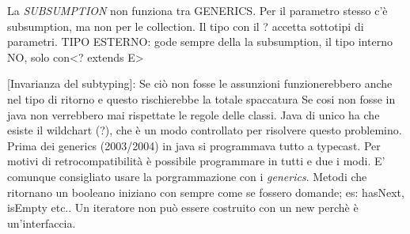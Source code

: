 \noindent La \textit{SUBSUMPTION} non funziona tra GENERICS. Per il parametro stesso c'è subsumption, ma non per le collection. Il tipo con il ? accetta sottotipi di parametri.
\newline
TIPO ESTERNO: gode sempre della la subsumption, il tipo interno NO, solo con<? extends E>  \newline

[Invarianza del subtyping]: Se ciò non fosse le assunzioni funzionerebbero anche nel tipo di ritorno e questo rischierebbe la totale spaccatura \newline
Se cosi non fosse in java non verrebbero mai rispettate le regole delle classi. \newline
Java di unico ha che esiste il wildchart (?), che è un modo controllato per risolvere questo problemino. \newline
Prima dei generics (2003/2004) in java si programmava tutto a typecast. Per motivi di retrocompatibilità è possibile programmare in tutti e due i modi. E' comunque consigliato usare la porgrammazione con i \textit{generics}. \newline
Metodi che ritornano un booleano iniziano con sempre come se fossero domande; es: hasNext, isEmpty etc.. \newline
Un iteratore non può essere costruito con un new perchè è un'interfaccia. 



\newpage
